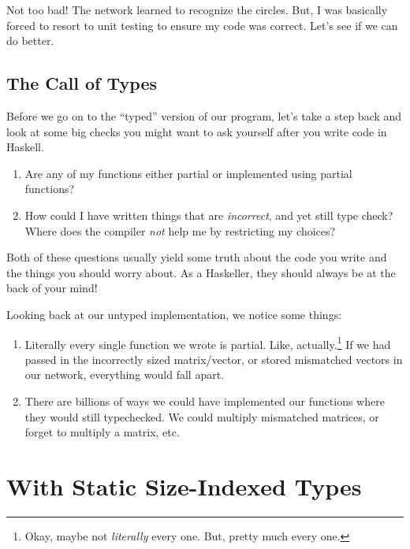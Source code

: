 \documentclass[]{article}
\begin{document}
Not too bad! The network learned to recognize the circles. But, I was basically
forced to resort to unit testing to ensure my code was correct. Let's see if we
can do better.

\hypertarget{the-call-of-types}{%
\subsection{The Call of Types}\label{the-call-of-types}}

Before we go on to the ``typed'' version of our program, let's take a step back
and look at some big checks you might want to ask yourself after you write code
in Haskell.

\begin{enumerate}
\def\labelenumi{\arabic{enumi}.}
\tightlist
\item
  Are any of my functions either partial or implemented using partial functions?
\item
  How could I have written things that are \emph{incorrect}, and yet still type
  check? Where does the compiler \emph{not} help me by restricting my choices?
\end{enumerate}

Both of these questions usually yield some truth about the code you write and
the things you should worry about. As a Haskeller, they should always be at the
back of your mind!

Looking back at our untyped implementation, we notice some things:

\begin{enumerate}
\def\labelenumi{\arabic{enumi}.}
\tightlist
\item
  Literally every single function we wrote is partial. Like, actually.\footnote{Okay,
    maybe not \emph{literally} every one. But, pretty much every one.} If we had
  passed in the incorrectly sized matrix/vector, or stored mismatched vectors in
  our network, everything would fall apart.
\item
  There are billions of ways we could have implemented our functions where they
  would still typechecked. We could multiply mismatched matrices, or forget to
  multiply a matrix, etc.
\end{enumerate}

\hypertarget{with-static-size-indexed-types}{%
\section{With Static Size-Indexed Types}\label{with-static-size-indexed-types}}
\end{document}
